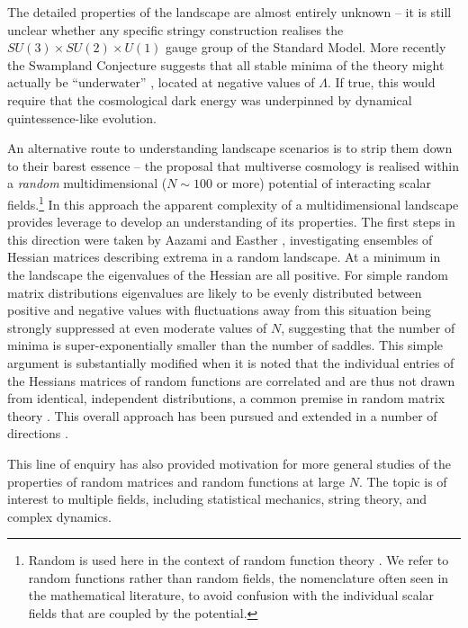 \documentclass[12pt]{article}
\begin{document}
The detailed properties of the landscape are almost entirely unknown -- it is still unclear whether any specific stringy construction  realises  the $SU(3) \times SU(2) \times U(1)$ gauge group of the Standard Model.  More recently the Swampland Conjecture suggests that all stable minima of the theory might actually be ``underwater'' \cite{Agrawal2018},  located at negative values of $\Lambda$. If true, this would require that the cosmological dark energy was underpinned by dynamical quintessence-like evolution.   

An alternative route to understanding  landscape scenarios is to strip them down to their barest essence -- the proposal that multiverse cosmology is realised within a {\em random\/} multidimensional ($N\sim100$ or more) potential of interacting scalar fields.\footnote{Random is used here in the  context of random function theory \cite{GRF1, GRF2, GRF3}.  We refer to random functions rather than random fields, the nomenclature often seen in the mathematical literature, to avoid confusion with the individual scalar fields that are coupled by the potential.}  In this approach the apparent complexity of a multidimensional landscape  provides  leverage to develop an understanding of its properties. The first steps in this direction were taken by Aazami and Easther \cite{Aazami2006}, investigating ensembles of Hessian matrices describing extrema in a random landscape.  At  a minimum in the landscape the eigenvalues of the Hessian are all positive. For simple random matrix distributions eigenvalues are likely to be evenly distributed between positive and negative values with fluctuations away from this situation being strongly suppressed at even moderate values of $N$, suggesting that the number of minima is super-exponentially smaller than the number of saddles. This simple argument is substantially modified when it is noted that the individual entries of the Hessians matrices of random functions are correlated and are thus not drawn from identical, independent distributions, a common premise in random matrix theory \cite{Battefeld2012}\cite{Easther2016}. This overall approach has been pursued and extended in a number of directions \cite{Easther2006, Frazer2011, Henry2009, Marsh2013, Agarwal2011,Yang2012,Masoumi2016,Yamada2018}.

This line of enquiry has also provided motivation for more general studies of the properties of random matrices and random functions at large $N$.\cite{Bray2007,Dean2008,Majumdar2009,Bachlechner2014,Battefeld2012,Fyodorov2013,Masoumi2017} The topic is of interest to multiple fields, including statistical mechanics, string theory, and complex dynamics.\cite{Fyodorov2004,Douglas2004,Douglas2006,Fyodorov2007,Fyodorov2012,Fyodorov2018,Ros2019}
\end{document}
